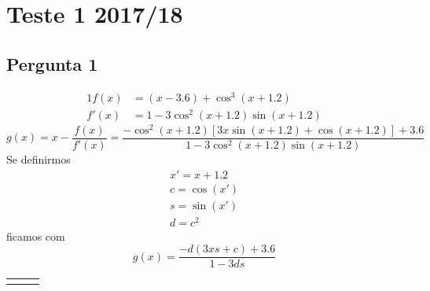 \setcounter{chapter}{16}
\chapter{Teste 1 2017/18}
\section{Pergunta 1}
\begin{alignat*}{1}
	f(x) &= (x-3.6)+\cos^3(x+1.2)\\
	f'(x) &= 1-3\cos^2(x+1.2)\sin(x+1.2)
\end{alignat*}
\begin{equation*}
	g(x)
	= x-\frac{f(x)}{f'(x)}
	= \frac{-\cos^2(x+1.2)[3x\sin(x+1.2)+\cos(x+1.2)]+3.6}{1-3\cos^2(x+1.2)\sin(x+1.2)}
\end{equation*}
Se definirmos
\begin{gather*}
	x' = x+1.2\\
	c = \cos(x')\\
	s = \sin(x')\\
	d = c^2
\end{gather*}
ficamos com
\begin{equation*}
	g(x)
	= \frac{-d(3xs+c)+3.6}{1-3ds}
\end{equation*}

\begin{center}
\begin{tabular}{ p{73mm} p{0mm} p{73mm} }
	 & &
	
\end{tabular}
\end{center}

